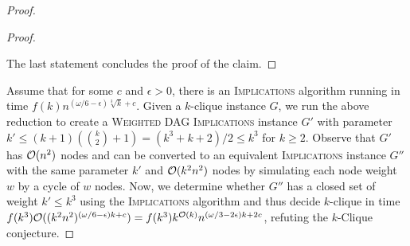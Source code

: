 \documentclass[10pt,a4paper]{article}
\theoremstyle{plain}
\newcommand{\Oh}{{\cal O}}
\newcommand{\Implication}{\textsc{Implications}\xspace}
\newcommand{\wDAGImplication}{\textsc{Weighted DAG Implications}\xspace}
\newcommand{\eps}{\epsilon}
\newcommand{\cqed}{}
\begin{document}
\begin{proof}
\begin{proof}
\begin{enumerate}[label=\arabic*)]
\end{enumerate}
The last statement concludes the proof of the claim.
\cqed
\end{proof}
%
Assume that for some $c$ and $\eps >0$, there is an \Implication algorithm running in time $f(k)n^{(\omega/6-\eps)\sqrt[3]{k}+c}$. Given a $k$-clique instance $G$, we run the above reduction to create a \wDAGImplication instance $G'$ with parameter $k'\le (k+1)({k \choose 2} + 1) = (k^3 + k+2)/2 \le k^3$ for $k\ge 2$. Observe that $G'$ has $\Oh(n^2)$ nodes and can be converted to an equivalent \Implication instance $G''$ with the same parameter $k'$ and $\Oh(k^2n^2)$ nodes by simulating each node weight~$w$ by a cycle of $w$ nodes. Now, we determine whether  $G''$ has a closed set of weight $k' \le k^3$ using the \Implication algorithm and thus decide $k$-clique in time $f(k^3)\Oh((k^2n^2)^{(\omega/6-\eps) k + c})=f(k^3)k^{\Oh(k)}n^{(\omega/3-2\eps) k + 2c}$, refuting the $k$-Clique conjecture.
\end{proof}
%
%
\end{document}
